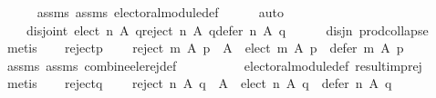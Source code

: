 \begin{isabellebody}
\ \ \ \ \isamarkupfalse%
\ assms{\isacharparenleft}{\kern0pt}{}{\isacharparenright}{\kern0pt}\ assms{\isacharparenleft}{\kern0pt}{}{\isacharparenright}{\kern0pt}\ electoral{\isacharunderscore}{\kern0pt}module{\isacharunderscore}{\kern0pt}def\isanewline
\ \ \ \ \isamarkupfalse%
\ auto\isanewline
\ \ \isamarkupfalse%
\ \isamarkupfalse%
\isanewline
\ \ \ \ {\isachardoublequoteopen}disjoint{}\ {\isacharparenleft}{\kern0pt}{\isacharparenleft}{\kern0pt}elect\ n\ A\ q{\isacharparenright}{\kern0pt}{\isacharcomma}{\kern0pt}{\isacharparenleft}{\kern0pt}reject\ n\ A\ q{\isacharparenright}{\kern0pt}{\isacharcomma}{\kern0pt}{\isacharparenleft}{\kern0pt}defer\ n\ A\ q{\isacharparenright}{\kern0pt}{\isacharparenright}{\kern0pt}{\isachardoublequoteclose}\isanewline
\ \ \ \ \isamarkupfalse%
\ disj{\isacharunderscore}{\kern0pt}n\ prod{\isachardot}{\kern0pt}collapse\isanewline
\ \ \ \ \isamarkupfalse%
\ metis\isanewline
\ \ \isamarkupfalse%
\ reject{\isacharunderscore}{\kern0pt}p{\isacharcolon}{\kern0pt}\isanewline
\ \ \ \ {\isachardoublequoteopen}reject\ m\ A\ p\ {\isacharequal}{\kern0pt}\ A\ {\isacharminus}{\kern0pt}\ {\isacharparenleft}{\kern0pt}{\isacharparenleft}{\kern0pt}elect\ m\ A\ p{\isacharparenright}{\kern0pt}\ {\isasymunion}\ {\isacharparenleft}{\kern0pt}defer\ m\ A\ p{\isacharparenright}{\kern0pt}{\isacharparenright}{\kern0pt}{\isachardoublequoteclose}\isanewline
\ \ \ \ \isamarkupfalse%
\ assms{\isacharparenleft}{\kern0pt}{}{\isacharparenright}{\kern0pt}\ assms{\isacharparenleft}{\kern0pt}{}{\isacharparenright}{\kern0pt}\ combine{\isacharunderscore}{\kern0pt}ele{\isacharunderscore}{\kern0pt}rej{\isacharunderscore}{\kern0pt}def\isanewline
\ \ \ \ \ \ \ \ \ \ electoral{\isacharunderscore}{\kern0pt}module{\isacharunderscore}{\kern0pt}def\ result{\isacharunderscore}{\kern0pt}imp{\isacharunderscore}{\kern0pt}rej\isanewline
\ \ \ \ \isamarkupfalse%
\ metis\isanewline
\ \ \isamarkupfalse%
\ reject{\isacharunderscore}{\kern0pt}q{\isacharcolon}{\kern0pt}\isanewline
\ \ \ \ {\isachardoublequoteopen}reject\ n\ A\ q\ {\isacharequal}{\kern0pt}\ A\ {\isacharminus}{\kern0pt}\ {\isacharparenleft}{\kern0pt}{\isacharparenleft}{\kern0pt}elect\ n\ A\ q{\isacharparenright}{\kern0pt}\ {\isasymunion}\ {\isacharparenleft}{\kern0pt}defer\ n\ A\ q{\isacharparenright}{\kern0pt}{\isacharparenright}{\kern0pt}{\isachardoublequoteclose}\isanewline
\ \ \ \ \isamarkupfalse%

\end{isabellebody}
